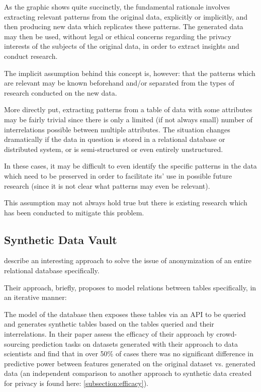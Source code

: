 As the graphic shows quite succinctly, the fundamental rationale involves extracting relevant patterns from the original data, explicitly or implicitly, and then producing new data which replicates these patterns. 
The generated data may then be used, without legal or ethical concerns regarding the privacy interests of the subjects of the original data, in order to extract insights and conduct research.

The implicit assumption behind this concept is, however: that the patterns which are relevant may be known beforehand and/or separated from the types of research conducted on the new data. 

More directly put, extracting patterns from a table of data with some attributes may be fairly trivial since there is only a limited (if not always small) number of interrelations possible between multiple attributes. 
The situation changes dramatically if the data in question is stored in a relational database or distributed system, or is semi-structured or even entirely unstructured.

In these cases, it may be difficult to even identify the specific patterns in the data which need to be preserved in order to facilitate its' use in possible future research (since it is not clear what patterns may even be relevant).

This assumption may not always hold true but there is existing research which has been conducted to mitigate this problem.

\pagebreak

\subsection{Synthetic Data Vault}

\cite{patki2016synthetic} describe an interesting approach to solve the issue of anonymization of an entire relational database specifically. 

Their approach, briefly, proposes to model relations between tables specifically, in an iterative manner:


The model of the database then exposes these tables via an \ac{API} to be queried and generates synthetic tables based on the tables queried and their interrelations.
In their paper \cite{patki2016synthetic} assess the efficacy of their approach by crowd-sourcing prediction tasks on datasets generated with their approach to data scientists and find that in over 50\% of cases 
there was no significant difference in predictive power between features generated on the original dataset vs. generated data (an independent comparison to another approach to synthetic data created for privacy is found here: \ref{subsection:efficacy}).

